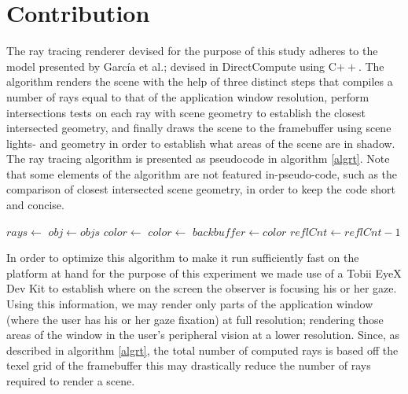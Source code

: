 
\section{Contribution}
The ray tracing renderer devised for the purpose of this study adheres to the model presented by Garc{\'i}a et al.; devised in DirectCompute using C$++$.
The algorithm renders the scene with the help of three distinct steps that compiles a number of rays equal to that of the application window resolution, perform intersections tests on each ray with scene geometry to establish the closest intersected geometry, and finally draws the scene to the framebuffer using scene lights- and geometry in order to establish what areas of the scene are in shadow.
The ray tracing algorithm is presented as pseudocode in algorithm \ref{algrt}.
Note that some elements of the algorithm are not featured in-pseudo-code, such as the comparison of closest intersected scene geometry, in order to keep the code short and concise.

\begin{algorithm}
\begin{algorithmic}[1]
\caption{Na{\"i}ve ray tracing algorithm}\label{algrt}
\State $rays\gets$
    \State $obj\gets objs$
\EndIf
\State $color\gets$
\State $color\gets$
\EndFor
\State $backbuffer\gets color$
\EndFor
\State $reflCnt\gets reflCnt - 1$
\EndWhile
\EndProcedure
\end{algorithmic}
\end{algorithm}

In order to optimize this algorithm to make it run sufficiently fast on the platform at hand for the purpose of this experiment we made use of a Tobii EyeX Dev Kit to establish where on the screen the observer is focusing his or her gaze.
Using this information, we may render only parts of the application window (where the user has his or her gaze fixation) at full resolution; rendering those areas of the window in the user's peripheral vision at a lower resolution.
Since, as described in algorithm \ref{algrt}, the total number of computed rays is based off the texel grid of the framebuffer this may drastically reduce the number of rays required to render a scene.

